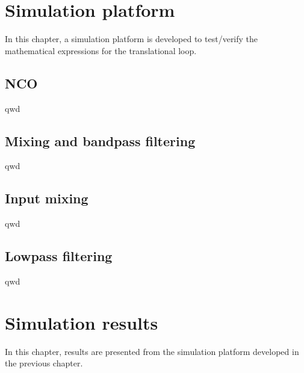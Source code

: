 

\chapter{Simulation platform} \label{ch:intro}
In this chapter, a simulation platform is developed to test/verify the mathematical expressions for the translational loop.

\section{NCO}
qwd

\section{Mixing and bandpass filtering}
qwd

\section{Input mixing}
qwd

\section{Lowpass filtering}
qwd

\chapter{Simulation results} \label{ch:intro}
In this chapter, results are presented from the simulation platform developed in the previous chapter.














